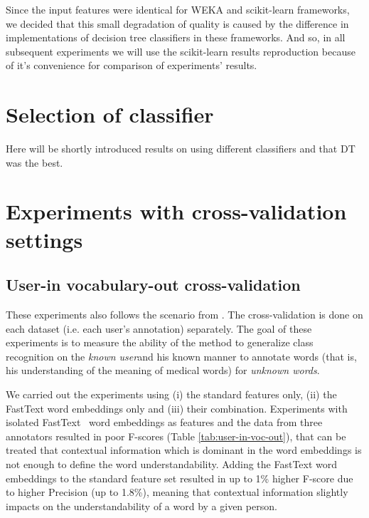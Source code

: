 Since the input features were identical for WEKA and scikit-learn frameworks, we decided that this small degradation of quality is caused by the difference in implementations of decision tree classifiers in these frameworks. And so, in all subsequent experiments we will use the scikit-learn results reproduction because of it's convenience for comparison of experiments' results. 

\section{Selection of classifier}
Here will be shortly introduced results on using different classifiers and that DT was the best.

\section{Experiments with cross-validation settings}
\subsection{User-in vocabulary-out cross-validation}

These experiments also follows the scenario from \citep{Grabar-PITR2014}. The cross-validation is done on each dataset (i.e. each user's annotation) separately. The goal of these experiments is to measure the ability of the method to generalize class recognition on the \textit{known user}and his known manner to annotate words (that is, his understanding of the meaning of medical words) for \textit{unknown words}. 

We carried out the experiments using (i) the standard features only, (ii) the FastText word embeddings only and (iii) their combination. Experiments with isolated FastText ~word embeddings as features and the data from three annotators resulted in poor F-scores (Table \ref{tab:user-in-voc-out}), that can be treated that contextual information which is dominant in the word embeddings is not enough to define the word understandability. Adding the FastText word embeddings to the standard feature set resulted in up to 1\% higher F-score due to higher Precision (up to 1.8\%), meaning that contextual information slightly impacts on the understandability of a word by a given person.

